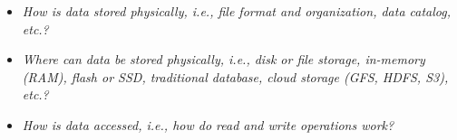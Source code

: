 
\begin{itemize}
\item \emph{How is data stored physically, i.e., file format and organization, data catalog, etc.?}
\item \emph{Where can data be stored physically, i.e., disk or file storage, in-memory (RAM), flash or SSD, traditional database, cloud storage (GFS, HDFS, S3), etc.?}
\item \emph{How is data accessed, i.e., how do read and write operations work?}
\end{itemize}